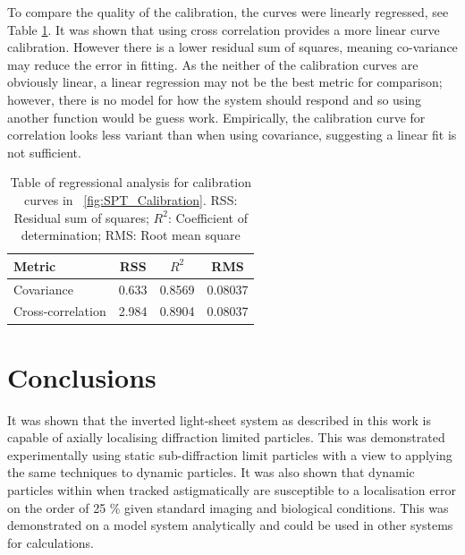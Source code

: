 To compare the quality of the calibration, %
the curves were linearly regressed, see Table \ref{tab:linear_calibration}.
It was shown that using cross correlation provides a more linear curve calibration.
However there is a lower residual sum of squares, meaning co-variance may reduce the error in fitting. %
As the neither of the calibration curves are obviously linear, a linear regression may not be the best metric for comparison; however, there is no model for how the system should respond and so using another function would be guess work.
Empirically, the calibration curve for correlation looks less variant than when using covariance, suggesting a linear fit is not sufficient.

\begin{table}[h]
\centering
\caption{Table of regressional analysis for calibration curves in \figurename~\ref{fig:SPT_Calibration}.
\label{tab:linear_calibration}
RSS: Residual sum of squares; $R^2$: Coefficient of determination; RMS: Root mean square}
  \begin{tabular}{lccc}
    \toprule
    Metric & RSS & $R^2$ & RMS \\\midrule
    Covariance & 0.633 & 0.8569 & 0.08037 \\
    Cross-correlation & 2.984 & 0.8904 & 0.08037 \\
    \bottomrule
  \end{tabular}
\end{table}



\section{Conclusions}

It was shown that the inverted light-sheet system as described in this work is capable of axially localising diffraction limited particles.
This was demonstrated experimentally using static sub-diffraction limit particles with a view to applying the same techniques to dynamic particles.
It was also shown that dynamic particles within when tracked astigmatically are susceptible to a localisation error on the order of 25 \% given standard imaging and biological conditions.
This was demonstrated on a model system analytically and could be used in other systems for calculations.

